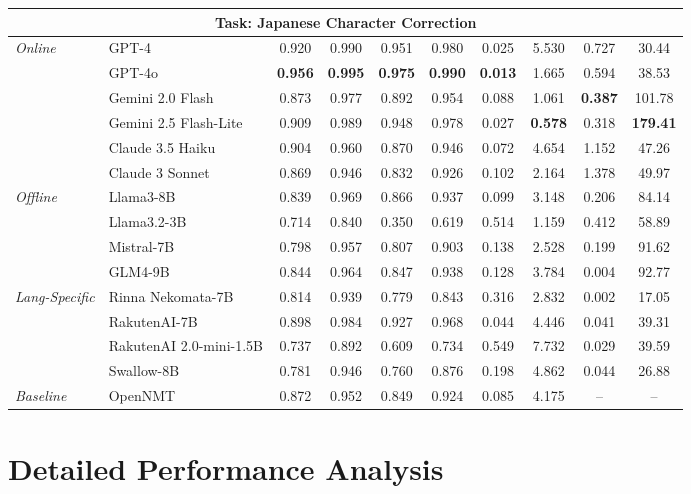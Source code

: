 \documentclass[10pt, a4paper]{article}
\begin{document}
\begin{table}[ht!]
{\begin{tabular}{l l cccccccc}
\midrule
\multicolumn{10}{c}{\textbf{Task: Japanese Character Correction}} \\
\midrule
\textit{Online} & GPT-4 & 0.920 & 0.990 & 0.951 & 0.980 & 0.025 & 5.530 & 0.727 & 30.44 \\
& GPT-4o & \textbf{0.956} & \textbf{0.995} & \textbf{0.975} & \textbf{0.990} & \textbf{0.013} & 1.665 & 0.594 & 38.53 \\
& Gemini 2.0 Flash & 0.873 & 0.977 & 0.892 & 0.954 & 0.088 & 1.061 & \textbf{0.387} & {101.78} \\
& Gemini 2.5 Flash-Lite & 0.909 & 0.989 & 0.948 & 0.978 & 0.027 & \textbf{0.578} & 0.318 & \textbf{179.41} \\
& Claude 3.5 Haiku & 0.904 & 0.960 & 0.870 & 0.946 & 0.072 & 4.654 & 1.152 & 47.26 \\
& Claude 3 Sonnet & 0.869 & 0.946 & 0.832 & 0.926 & 0.102 & 2.164 & 1.378 & 49.97 \\
\midrule
\textit{Offline} & Llama3-8B & 0.839 & 0.969 & 0.866 & 0.937 & 0.099 & 3.148 & 0.206 & 84.14 \\
& Llama3.2-3B & 0.714 & 0.840 & 0.350 & 0.619 & 0.514 & 1.159 & 0.412 & 58.89 \\
& Mistral-7B & 0.798 & 0.957 & 0.807 & 0.903 & 0.138 & 2.528 & 0.199 & 91.62 \\
& GLM4-9B & 0.844 & 0.964 & 0.847 & 0.938 & 0.128 & 3.784 & 0.004 & 92.77 \\
\midrule
\textit{Lang-Specific} & Rinna Nekomata-7B & 0.814 & 0.939 & 0.779 & 0.843 & 0.316 & 2.832 & 0.002 & 17.05 \\
& RakutenAI-7B & 0.898 & 0.984 & 0.927 & 0.968 & 0.044 & 4.446 & 0.041 & 39.31 \\
& RakutenAI 2.0-mini-1.5B & 0.737 & 0.892 & 0.609 & 0.734 & 0.549 & 7.732 & 0.029 & 39.59 \\
& Swallow-8B & 0.781 & 0.946 & 0.760 & 0.876 & 0.198 & 4.862 & 0.044 & 26.88 \\
\midrule
\textit{Baseline} & {OpenNMT} & 0.872 & 0.952 & 0.849 & 0.924 & 0.085 & 4.175 & -- & -- \\
\bottomrule
\end{tabular}
}
\end{table}

\section{Detailed Performance Analysis}
\label{appendix:detailed_analysis}
\end{document}
